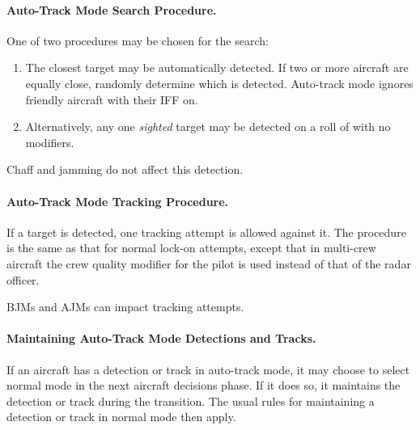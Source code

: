 {\begin{advancedrules}
\begin{itemize}
\end{itemize}


\paragraph{Auto-Track Mode Search Procedure.}

One of two procedures may be chosen for the search:
\begin{enumerate}
\item The closest target may be automatically detected. If two or more aircraft are equally close, randomly determine which is detected. Auto-track mode ignores friendly aircraft with their IFF on.
\item Alternatively, any one \emph{sighted} target may be detected on a roll of  with no modifiers.
\end{enumerate}

Chaff and jamming do not affect this detection. 

\paragraph{Auto-Track Mode Tracking Procedure.}

If a target is detected, one tracking attempt is allowed against it. The procedure is the same as that for normal lock-on attempts, except that in  multi-crew aircraft the crew quality modifier for the pilot is used instead of that of the radar officer.

BJMs and AJMs can impact tracking attempts.

\paragraph{Maintaining Auto-Track Mode Detections and Tracks.}

If an aircraft has a detection or track in auto-track mode, it may choose to select normal mode in the next aircraft decisions phase. If it does so, it maintains the detection or track during the transition. The usual rules for maintaining a detection or track in normal mode then apply.


\end{advancedrules}}
